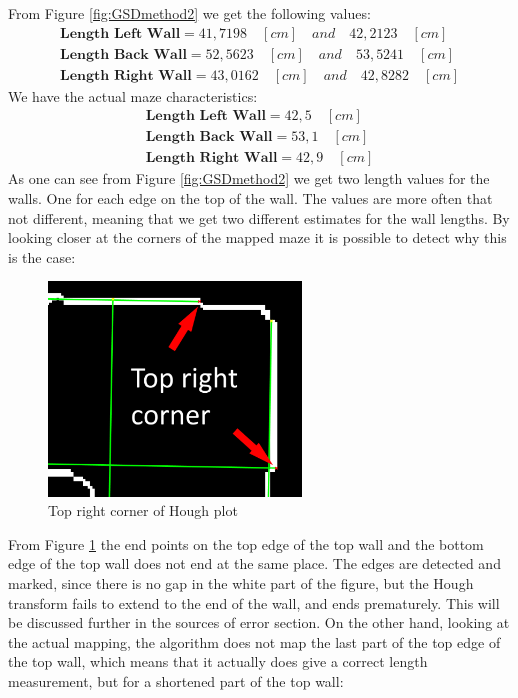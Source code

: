 From Figure \ref{fig:GSDmethod2} we get the following values:
\begin{align*}
\textbf{Length Left Wall} = 41,7198\quad[cm] \quad and \quad42,2123\quad[cm]\\
\textbf{Length Back Wall} = 52,5623\quad[cm] \quad and \quad53,5241\quad[cm]\\
\textbf{Length Right Wall} = 43,0162\quad[cm] \quad and \quad42,8282\quad[cm]
\end{align*}
We have the actual maze characteristics:
\begin{align*}
\textbf{Length Left Wall} = 42,5\quad[cm]\\
\textbf{Length Back Wall} = 53,1\quad[cm]\\
\textbf{Length Right Wall} = 42,9\quad[cm]
\end{align*}
As one can see from Figure \ref{fig:GSDmethod2} we get two length values for the walls. One for each edge on the top of the wall. The values are more often that not different, meaning that we get two different estimates for the wall lengths. By looking closer at the corners of the mapped maze it is possible to detect why this is the case:
\begin{figure}[H]
\centering
\includegraphics[width=0.6\textwidth]{fig/error}
  \caption{Top right corner of Hough plot}
  \label{fig:error}
\end{figure}
From Figure \ref{fig:error} the end points on the top edge of the top wall and the bottom edge of the top wall does not end at the same place. The edges are detected and marked, since there is no gap in the white part of the figure, but the Hough transform fails to extend to the end of the wall, and ends prematurely. This will be discussed further in the sources of error section. On the other hand, looking at the actual mapping, the algorithm does not map the last part of the top edge of the top wall, which means that it actually does give a correct length measurement, but for a shortened part of the top wall:
